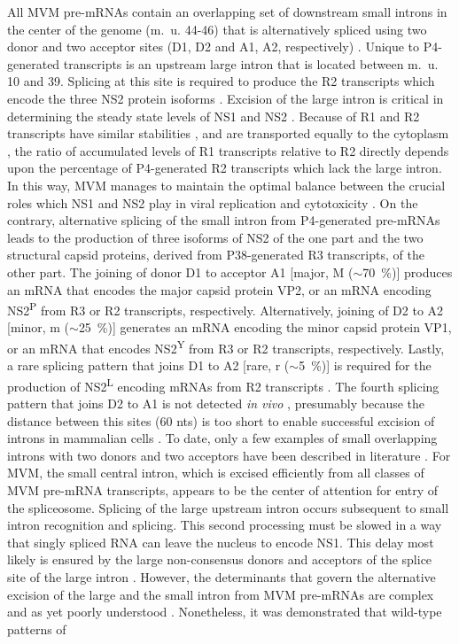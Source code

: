 All MVM pre-mRNAs contain an overlapping set of downstream small introns in the center of the genome (m.~u. 44-46) that is alternatively spliced using two donor and two acceptor sites (D1, D2 and A1, A2, respectively) \cite{pmid2942705, pmid3783817, pmid2164605, pmid2142555}. Unique to P4-generated transcripts is an upstream large intron that is located between m.~u. 10 and 39. Splicing at this site is required to produce the R2 transcripts which encode the three NS2 protein isoforms \cite{pmid6623929, pmid6828378, pmid2942705}. Excision of the large intron is critical in determining the steady state levels of NS1 and NS2 \cite{pmid1825251, pmid2142555}. Because of R1 and R2 transcripts have similar stabilities \cite{pmid1825251}, and are transported equally to the cytoplasm \cite{pmid1592259}, the ratio of accumulated levels of R1 transcripts relative to R2 directly depends upon the percentage of P4-generated R2 transcripts which lack the large intron. In this way, MVM manages to maintain the optimal balance between the crucial roles which NS1 and NS2 play in viral replication and cytotoxicity \cite{pmid3296697}. On the contrary, alternative splicing of the small intron from P4-generated pre-mRNAs leads to the production of three isoforms of NS2 \cite{pmid3783817, pmid2142555, pmid2164605} of the one part and the two structural capsid proteins, derived from P38-generated R3 transcripts, of the other part. The joining of donor D1 to acceptor A1 [major, M ($\sim$70~\%)] produces an mRNA that encodes the major capsid protein VP2, or an mRNA encoding NS2\textsuperscript{P} from R3 or R2 transcripts, respectively. Alternatively, joining of D2 to A2 [minor, m ($\sim$25~\%)] generates an mRNA encoding the minor capsid protein VP1, or an mRNA that encodes NS2\textsuperscript{Y} from R3 or R2 transcripts, respectively. Lastly, a rare splicing pattern that joins D1 to A2 [rare, r ($\sim$5~\%)] is required for the production of NS2\textsuperscript{L} encoding mRNAs from R2 transcripts \cite{pmid3502703, pmid2942705, pmid3783817, pmid3951017}. The fourth splicing pattern that joins D2 to A1 is not detected \textit{in vivo} \cite{pmid3783817}, presumably because the distance between this sites (60 nts) is too short to enable successful excision of introns in mammalian cells \cite{pmid2943217}. To date, only a few examples of small overlapping introns with two donors and two acceptors have been described in literature \cite{pmid1335742, pmid1824726, pmid1839712}. For MVM, the small central intron, which is excised efficiently from all classes of MVM pre-mRNA transcripts, appears to be the center of attention for entry of the spliceosome. Splicing of the large upstream intron occurs subsequent to small intron recognition and splicing. This second processing must be slowed in a way that singly spliced RNA can leave the nucleus to encode NS1. This delay most likely is ensured by the large non-consensus donors and acceptors of the splice site of the large intron \cite{Transcription}. However, the determinants that govern the alternative excision of the large and the small intron from MVM pre-mRNAs are complex and as yet poorly understood \cite{pmid9499034, pmid10329570, pmid8151756, pmid7666519, pmid7637034, pmid9858560}. Nonetheless, it was demonstrated that wild-type patterns of 
